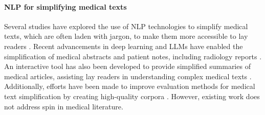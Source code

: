 \paragraph{NLP for simplifying medical texts} Several studies have explored the use of NLP technologies to simplify medical texts, which are often laden with jargon, to make them more accessible to lay readers \citep{ondov2022survey}. Recent advancements in deep learning and LLMs have enabled the simplification of medical abstracts \citep{devaraj2021paragraph, shaib-etal-2023-summarizing} and patient notes, including radiology reports \citep{bala2020patient, jeblick2024chatgpt}. An interactive tool has also been developed to provide simplified summaries of medical articles, assisting lay readers in understanding complex medical texts \citep{august2023paper}. Additionally, efforts have been made to improve evaluation methods for medical text simplification by creating high-quality corpora \citep{devaraj2022evaluating, joseph2023multilingual}. However, existing work does not address spin in medical literature.